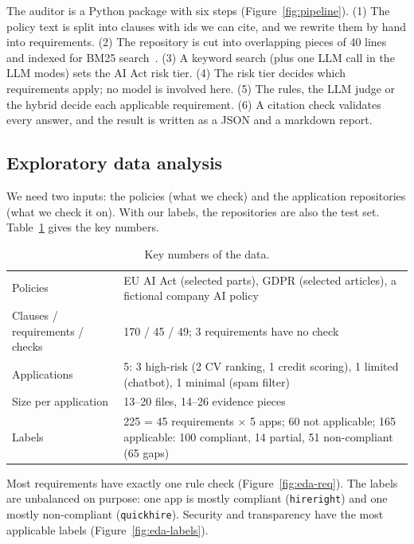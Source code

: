 The auditor is a Python package with six steps (Figure~\ref{fig:pipeline}). (1) The policy text is split into
clauses with ids we can cite, and we rewrite them by hand into requirements. (2) The repository is cut into overlapping
pieces of 40 lines and indexed for BM25 search~\cite{robertson2009bm25}. (3) A keyword search (plus one LLM call in the
LLM modes) sets the AI Act risk tier. (4) The risk tier decides which requirements apply; no model is involved here.
(5) The rules, the LLM judge or the hybrid decide each applicable requirement. (6) A citation check validates every
answer, and the result is written as a JSON and a markdown report.

\subsection{Exploratory data analysis}
\label{section:eda}

We need two inputs: the policies (what we check) and the application repositories (what we check it on). With our
labels, the repositories are also the test set. Table~\ref{tab:data} gives the key numbers.

\begin{table}[htbp]
\caption{Key numbers of the data.}
\label{tab:data}
\centering\small
\begin{tabularx}{\linewidth}{@{}>{\raggedright\arraybackslash}p{4.2cm}X@{}}
\toprule
Policies & EU AI Act (selected parts), GDPR (selected articles), a fictional company AI policy \\
Clauses / requirements / checks & 170 / 45 / 49; 3 requirements have no check \\
Applications & 5: 3 high-risk (2 CV ranking, 1 credit scoring), 1 limited (chatbot), 1 minimal (spam filter) \\
Size per application & 13--20 files, 14--26 evidence pieces \\
Labels & 225 = 45 requirements $\times$ 5 apps; 60 not applicable; 165 applicable: 100 compliant, 14 partial,
51 non-compliant (65 gaps) \\
\bottomrule
\end{tabularx}
\end{table}

Most requirements have exactly one rule check (Figure~\ref{fig:eda-req}). The labels are unbalanced on purpose: one
app is mostly compliant (\texttt{hireright}) and one mostly non-compliant (\texttt{quickhire}). Security and
transparency have the most applicable labels (Figure~\ref{fig:eda-labels}).

